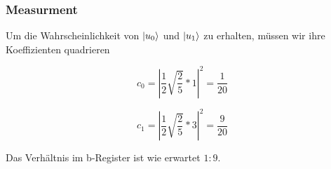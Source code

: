 \begin{frame}
    \frametitle{Measurment}

Um die Wahrscheinlichkeit von $ \ket{u_0}$ und $\ket{u_1}$ zu erhalten, müssen wir ihre Koeffizienten quadrieren

$$ c_0=\left|\frac{1}{2}\sqrt{\frac{2}{5}}*1\right|^2 = \frac{1}{20} $$

$$ c_1=\left|\frac{1}{2}\sqrt{\frac{2}{5}}*3\right|^2 = \frac{9}{20} $$

Das Verhältnis im b-Register ist wie erwartet $1:9$.

\end{frame}




